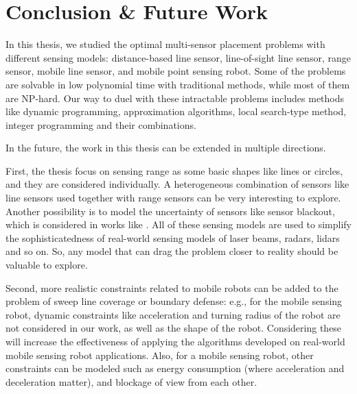 
\chapter{Conclusion \& Future Work}
\thispagestyle{myheadings}
In this thesis, we studied the optimal multi-sensor placement problems with different sensing models:
distance-based line sensor, line-of-sight line sensor, range sensor, mobile line sensor, and mobile point sensing robot.
Some of the problems are solvable in low polynomial time with traditional methods, while most of them are NP-hard.
Our way to duel with these intractable problems includes methods like dynamic programming, approximation algorithms,
local search-type method, integer programming and their combinations. 

In the future, the work in this thesis can be extended in multiple directions.

First, the thesis focus on sensing range as some basic shapes like lines or circles, and they are considered individually.
A heterogeneous combination of sensors like line sensors used together with range sensors can be very interesting to explore.
Another possibility is to model the uncertainty of sensors like sensor blackout, which is considered in works like \cite{Olsen2022ICRA}.
All of these sensing models are used to simplify the sophisticatedness of real-world sensing models of laser beams, radars, lidars and so on.
So, any model that can drag the problem closer to reality should be valuable to explore.

Second, more realistic constraints related to mobile robots can be added to the problem of sweep line coverage or boundary defense: 
e.g., for the mobile sensing robot, dynamic constraints like acceleration and turning radius of the robot are not considered in our work, 
as well as the shape of the robot. 
Considering these will increase the effectiveness of applying the algorithms developed on real-world mobile sensing robot applications.
Also, for a mobile sensing robot, other constraints can be modeled such as energy consumption (where acceleration and deceleration matter), and
blockage of view from each other.

